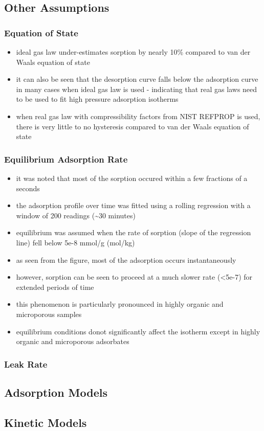 \documentclass[11pt]{article}
\begin{document}
\subsection{Other Assumptions}
\label{sec:org199b507}
\subsubsection{Equation of State}
\label{sec:orga196d77}
\begin{itemize}
\item ideal gas law under-estimates sorption by nearly 10\% compared to van der Waals equation of state
\item it can also be seen that the desorption curve falls below the adsorption curve in many cases when ideal gas law is used - indicating that real gas laws need to be used to fit high pressure adsorption isotherms
\item when real gas law with compressibility factors from NIST REFPROP is used, there is very little to no hysteresis compared to van der Waals equation of state
\end{itemize}
\subsubsection{Equilibrium Adsorption Rate}
\label{sec:org57465fb}
\begin{itemize}
\item it was noted that most of the sorption occured within a few fractions of a seconds
\item the adsorption profile over time was fitted using a rolling regression with a window of 200 readings (\textasciitilde{}30 minutes)
\item equilibrium was assumed when the rate of sorption (slope of the regression line) fell below 5e-8 mmol/g (mol/kg)
\item as seen from the figure, most of the adsorption occurs instantaneously
\item however, sorption can be seen to proceed at a much slower rate (<5e-7) for extended periods of time
\item this phenomenon is particularly pronounced in highly organic and microporous samples
\item equilibrium conditions donot significantly affect the isotherm except in highly organic and microporous adsorbates
\end{itemize}
\subsubsection{Leak Rate}
\label{sec:org10780c9}
\subsection{Adsorption Models}
\label{sec:org6823f77}
\subsection{Kinetic Models}
\label{sec:org883a50f}
\end{document}
